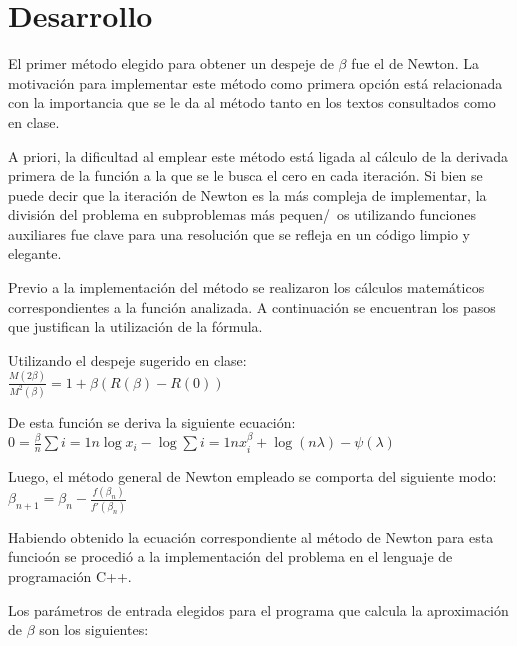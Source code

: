 \section{Desarrollo}
El primer m\'etodo elegido para obtener un despeje de $\beta$ fue el de Newton. La motivaci\'on para implementar este m\'etodo como primera opci\'on est\'a relacionada con la importancia que se le da al m\'etodo tanto en los textos consultados como en clase. 

A priori, la dificultad al emplear este m\'etodo est\'a ligada al c\'alculo de la derivada primera de la funci\'on a la que se le busca el cero en cada iteraci\'on. Si bien se puede decir que la iteraci\'on de Newton es la m\'as compleja de implementar, la divisi\'on del problema en subproblemas m\'as pequen/~os utilizando funciones auxiliares fue clave para una resoluci\'on que se refleja en un c\'odigo limpio y elegante.


Previo a la implementaci\'on del m\'etodo se realizaron los c\'alculos matem\'aticos correspondientes a la funci\'on analizada. A continuaci\'on se encuentran los pasos que justifican la utilizaci\'on de la f\'ormula.

Utilizando el despeje sugerido en clase:\\

$\frac{M(2\beta)}{M^2(\beta)}=1 + \beta(R(\beta)-R(0))$

De esta funci\'on se deriva la siguiente ecuaci\'on: \\

$0 = \frac{\beta}{n}\sum{i=1}{n}\log x_i - \log \sum{i=1}{n}x_i^{\beta} + \log(n\lambda)-\psi(\lambda)$

Luego, el m\'etodo general de Newton empleado se comporta del siguiente modo: \\

$\beta_{n+1} = \beta_{n} - \frac{f(\beta_{n})}{f'(\beta_{n})}$

Habiendo obtenido la ecuaci\'on correspondiente al m\'etodo de Newton para esta funcio\'on se procedi\'o a la implementaci\'on del problema en el lenguaje de programaci\'on C++.

Los par\'ametros de entrada elegidos para el programa que calcula la aproximaci\'on de $\beta$ son los siguientes:

